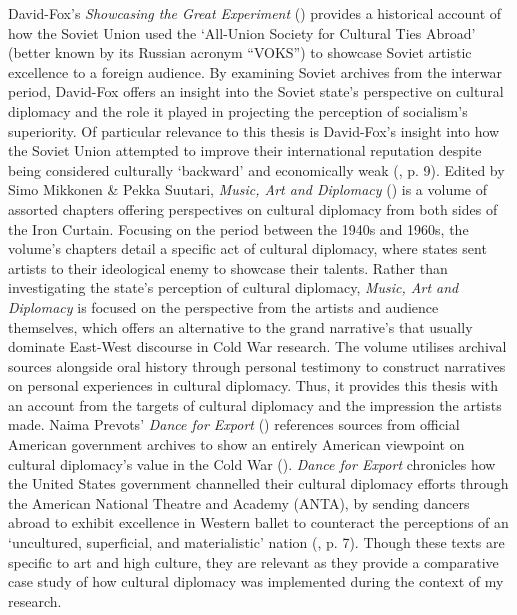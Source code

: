 David-Fox’s \textit{Showcasing the Great Experiment} (\citeyear{david-fox2011}) provides a historical account of how the Soviet Union used the ‘All-Union Society for Cultural Ties Abroad’ (better known by its Russian acronym “VOKS”) to showcase Soviet artistic excellence to a foreign audience. By examining Soviet archives from the interwar period, David-Fox offers an insight into the Soviet state’s perspective on cultural diplomacy and the role it played in projecting the perception of socialism’s superiority. Of particular relevance to this thesis is David-Fox’s insight into how the Soviet Union attempted to improve their international reputation despite being considered culturally ‘backward’ and economically weak (\cite{david-fox2011}, p. 9). Edited by Simo Mikkonen \& Pekka Suutari, \textit{Music, Art and Diplomacy} (\citeyear{mikkonensuutari2016}) is a volume of assorted chapters offering perspectives on cultural diplomacy from both sides of the Iron Curtain. Focusing on the period between the 1940s and 1960s, the volume’s chapters detail a specific act of cultural diplomacy, where states sent artists to their ideological enemy to showcase their talents. Rather than investigating the state’s perception of cultural diplomacy, \textit{Music, Art and Diplomacy} is focused on the perspective from the artists and audience themselves, which offers an alternative to the grand narrative’s that usually dominate East-West discourse in Cold War research. The volume utilises archival sources alongside oral history through personal testimony to construct narratives on personal experiences in cultural diplomacy. Thus, it provides this thesis with an account from the targets of cultural diplomacy and the impression the artists made. Naima Prevots’ \textit{Dance for Export} (\citeyear{prevots1998}) references sources from official American government archives to show an entirely American viewpoint on cultural diplomacy’s value in the Cold War (\cite{prevots1998}). \textit{Dance for Export} chronicles how the United States government channelled their cultural diplomacy efforts through the American National Theatre and Academy (ANTA), by sending dancers abroad to exhibit excellence in Western ballet to counteract the perceptions of an ‘uncultured, superficial, and materialistic’ nation (\cite{prevots1998}, p. 7). Though these texts are specific to art and high culture, they are relevant as they provide a comparative case study of how cultural diplomacy was implemented during the context of my research.

